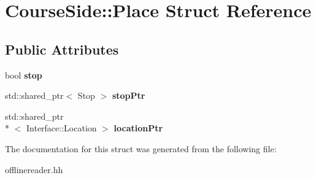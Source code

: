 \hypertarget{structCourseSide_1_1Place}{\section{Course\-Side\-:\-:Place Struct Reference}
\label{structCourseSide_1_1Place}
}
\subsection*{Public Attributes}
\begin{DoxyCompactItemize}
\item 
\hypertarget{structCourseSide_1_1Place_a5acbdcbbb55eab5bfd09a2106ce879f3}{bool {\bfseries stop}}\label{structCourseSide_1_1Place_a5acbdcbbb55eab5bfd09a2106ce879f3}

\item 
\hypertarget{structCourseSide_1_1Place_ac7525f9347a6d14754afa595af1dd1a2}{std\-::shared\-\_\-ptr$<$ Stop $>$ {\bfseries stop\-Ptr}}\label{structCourseSide_1_1Place_ac7525f9347a6d14754afa595af1dd1a2}

\item 
\hypertarget{structCourseSide_1_1Place_a045081015d0aa2b28b4e10e1d54b9c87}{std\-::shared\-\_\-ptr\\*
$<$ Interface\-::\-Location $>$ {\bfseries location\-Ptr}}\label{structCourseSide_1_1Place_a045081015d0aa2b28b4e10e1d54b9c87}

\end{DoxyCompactItemize}


The documentation for this struct was generated from the following file\-:\begin{DoxyCompactItemize}
\item 
offlinereader.\-hh\end{DoxyCompactItemize}
